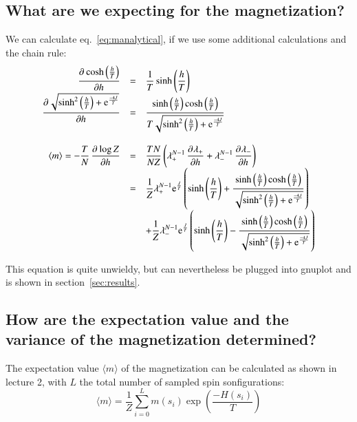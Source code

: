 \documentclass{scrartcl}
\begin{document}
\subsection{What are we expecting for the magnetization?}
\label{subsec:expectationmagnetization}
We can calculate eq.~\ref{eq:manalytical}, if we use some additional calculations and the chain rule:
\[\begin{array}{>{\displaystyle}r>{\displaystyle}c>{\displaystyle}l}
\dpd{\cosh\left( \frac{h}{T}\right)}{h}
&=&\frac{1}{T}\sinh\left( \frac{h}{T}\right)\\

\dpd{\sqrt{\sinh^2\left(\frac{h}{T} \right)+\text{e}^{\frac{-4J}{T}} }}{h}
&=&\frac{\sinh\left( \frac{h}{T}\right)\cosh\left( \frac{h}{T}\right)}
{T\sqrt{\sinh^2\left(\frac{h}{T} \right)+\text{e}^{\frac{-4J}{T}} }}\\

&&\\

\langle m\rangle =-\frac{T}{N}\dpd{\log Z}{h}
&=&\frac{TN}{NZ}\left( \lambda_+^{N-1}\dpd{\lambda_+}{h}+\lambda_-^{N-1}\dpd{\lambda_-}{h}\right) \\

&=&\frac{1}{Z} 
\lambda_+^{N-1} \text{e}^{\frac{J}{T}}
\left( \sinh\left(\frac{h}{T} \right) 
+ \frac{\sinh\left( \frac{h}{T}\right)\cosh\left( \frac{h}{T}\right)}
{\sqrt{\sinh^2\left(\frac{h}{T} \right)+\text{e}^{\frac{-4J}{T}} }} \right)\\

  
&&+\frac{1}{Z}\lambda_-^{N-1}\text{e}^{\frac{J}{T}}
\left( \sinh\left(\frac{h}{T} \right) 
- \frac{\sinh\left( \frac{h}{T}\right)\cosh\left( \frac{h}{T}\right)}
{\sqrt{\sinh^2\left(\frac{h}{T} \right)+\text{e}^{\frac{-4J}{T}} }} \right)

\end{array}\]

This equation is quite unwieldy, but can nevertheless be plugged into gnuplot and is shown in section~\ref{sec:results}.
	
\subsection{How are the expectation value and the variance of the magnetization determined?}

The expectation value $\langle m\rangle$ of the magnetization can be calculated as shown in lecture 2, with $L$ the total number of sampled spin sonfigurations: 
\[\langle m\rangle=\frac{1}{Z}\sum_{i=0}^{L}m(s_i)\exp\left( \frac{-H(s_i)}{T}\right) \]
\end{document}
